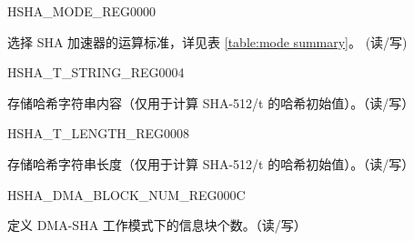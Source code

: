 \begin{register}{H}{SHA\_MODE\_REG}{\hexprefix{}0000}\label{regdesc:SHAMODEREG}
%
%
\regnewline%
\begin{regdesc}\begin{reglist}
\label{fielddesc:SHAMODE}\item [SHA\_MODE] 选择 SHA 加速器的运算标准，详见表 \ref{table:mode summary}。 (读/写)
\end{reglist}\end{regdesc}
\end{register}


\begin{register}{H}{SHA\_T\_STRING\_REG}{\hexprefix{}0004}\label{regdesc:SHATSTRINGREG}
%
\regnewline%
\begin{regdesc}\begin{reglist}
\label{fielddesc:SHATSTRING}\item [SHA\_T\_STRING] 存储哈希字符串内容（仅用于计算 SHA-512/t 的哈希初始值）。（读/写）
\end{reglist}\end{regdesc}
\end{register}


\begin{register}{H}{SHA\_T\_LENGTH\_REG}{\hexprefix{}0008}\label{regdesc:SHATLENGTHREG}
%
%
\regnewline%
\begin{regdesc}\begin{reglist}
\label{fielddesc:SHATLENGTH}\item [SHA\_T\_LENGTH] 存储哈希字符串长度（仅用于计算 SHA-512/t 的哈希初始值）。（读/写）
\end{reglist}\end{regdesc}
\end{register}


\begin{register}{H}{SHA\_DMA\_BLOCK\_NUM\_REG}{\hexprefix{}000C}\label{regdesc:SHADMABLOCKNUMREG}
%
%
\regnewline%
\begin{regdesc}\begin{reglist}
\label{fielddesc:SHADMABLOCKNUM}\item [SHA\_DMA\_BLOCK\_NUM] 定义 DMA-SHA 工作模式下的信息块个数。（读/写）
\end{reglist}\end{regdesc}
\end{register}

